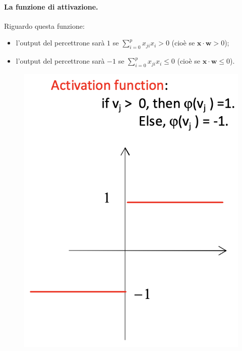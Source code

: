 \paragraph{La funzione di attivazione.}
Riguardo questa funzione:
\begin{itemize}
    \item l'output del percettrone sarà $1$ se $\sum_{i=0}^px_{ji}x_i>0$ (cioè se $\textbf{x}\cdot\textbf{w}>0$);
    \item l'output del percettrone sarà $-1$ se $\sum_{i=0}^px_{ji}x_i\leq0$ (cioè se $\textbf{x}\cdot\textbf{w}\leq0$).
\end{itemize}
\begin{figure}[!h]
    \includegraphics[scale=.4]{images/perceptron/actFun.png}
    \centering
\end{figure}


